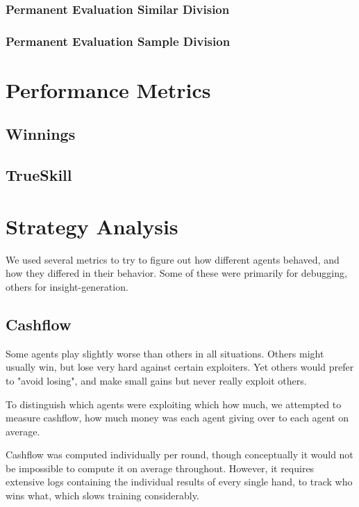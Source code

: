 \subsubsection{Permanent Evaluation Similar Division}
\subsubsection{Permanent Evaluation Sample Division}


\section{Performance Metrics}

\subsection{Winnings}

\subsection{TrueSkill}


\section{Strategy Analysis}

We used several metrics to try to figure out how different agents behaved, and how they differed in their behavior. Some of these were primarily for debugging, others for insight-generation.

\subsection{Cashflow}

Some agents play slightly worse than others in all situations. Others might usually win, but lose very hard against certain exploiters. Yet others would prefer to "avoid losing", and make small gains but never really exploit others.

To distinguish which agents were exploiting which how much, we attempted to measure cashflow, how much money was each agent giving over to each agent on average.


Cashflow was computed individually per round, though conceptually it would not be impossible to compute it on average throughout. However, it requires extensive logs containing the individual results of every single hand, to track who wins what, which slows training considerably.

